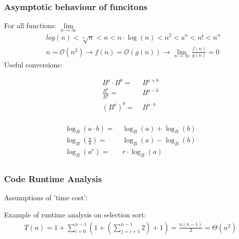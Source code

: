     \subsubsection{Asymptotic behaviour of funcitons}
        For all functions: $\lim\limits_{n \rightarrow \infty}$
        \begin{align*}
            &log(n) < \sqrt[a]{n} < n < n \cdot \log(n) < n^2 < a^n < n! < n^n\\
            &n = \mathcal{O}(n^2) \rightarrow f(n) = \mathcal{O}(g(n)) \rightarrow \lim\limits_{n \rightarrow \infty} \frac{f(n)}{g(n)} = 0
        \end{align*}
        Useful conversions:\\
        \begin{minipage}{0.29\linewidth}
            \begin{align*}
                B^a \cdot B^b =& \; B^{a + b}\\
                \frac{B^a}{B^b} =& \; B^{a - b}\\
                (B^a)^b =& \; B^{a \cdot b}\\
            \end{align*}
        \end{minipage}
        \begin{minipage}{0.69\linewidth}
            \begin{align*}
                \log_B (a \cdot b ) =& \; \log_B (a) + \log_B (b)\\
                \log_B \left( \frac{a}{b} \right) =& \; \log_B (a) - \log_B (b)\\
                \log_B (a^r) =& \; r \cdot \log_B (a)\\
            \end{align*}
        \end{minipage}
    
    \subsubsection{Code Runtime Analysis}
        Assumptions of 'time cost':
        

        Example of runtime analysis on selection sort:
        \begin{align*}
            T(n) = 1 + \sum_{i = 0}^{n-1} \left( 1 + \left(\sum_{j = i+1}^{n-1} 2 \right) + 1\right) = \frac{n (n-1)}{2} = \Theta(n^2)
        \end{align*}
        

